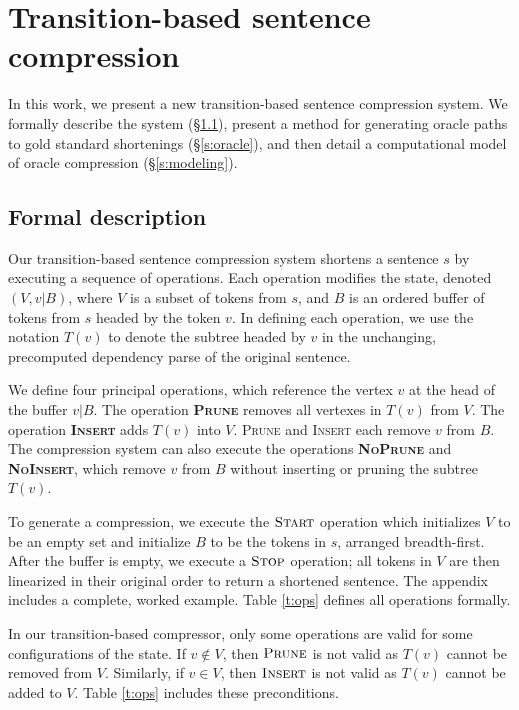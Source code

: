 \documentclass[11pt,a4paper]{article}
\begin{document}
\section{Transition-based sentence compression}\label{s:system}

In this work, we present a new transition-based sentence compression system. We formally describe the system (\S\ref{s:formal}), present a method for generating oracle paths to gold standard shortenings (\S\ref{s:oracle}), and then detail a computational model of oracle compression (\S\ref{s:modeling}).

\subsection{Formal description}\label{s:formal}

Our transition-based sentence compression system shortens a sentence $s$ by executing a sequence of operations. Each operation modifies the state, denoted $(V,v|B)$, where $V$ is a subset of tokens from $s$, and $B$ is an ordered buffer of tokens from $s$ headed by the token $v$. In defining each operation, we use the notation $T(v)$ to denote the subtree headed by $v$ in the unchanging, precomputed dependency parse of the original sentence.

We define four principal operations, which reference the vertex $v$ at the head of the buffer $v|B$. The operation \textbf{\textsc{Prune}} removes all vertexes in $T(v)$ from $V$. The operation \textbf{\textsc{Insert}} adds $T(v)$ into $V$. \textsc{Prune} and \textsc{Insert} each remove $v$ from $B$. The compression system can also execute the operations \textbf{\textsc{NoPrune}} and \textbf{\textsc{NoInsert}}, which remove $v$ from $B$ without inserting or pruning the subtree $T(v)$. 

To generate a compression, we execute the $\textsc{Start}$ operation which initializes $V$ to be an empty set and initialize $B$ to be the tokens in $s$, arranged breadth-first. After the buffer is empty, we execute a $\textsc{Stop}$ operation; all tokens in $V$ are then linearized in their original order to return a shortened sentence. The appendix includes a complete, worked example. Table \ref{t:ops} defines all operations formally. 

In our transition-based compressor, only some operations are valid for some configurations of the state. If $v \notin V$, then $\textsc{Prune}$ is not valid as $T(v)$ cannot be removed from $V$. Similarly, if $v \in V$, then $\textsc{Insert}$ is not valid as $T(v)$ cannot be added to $V$. Table \ref{t:ops} includes these preconditions.
\end{document}
